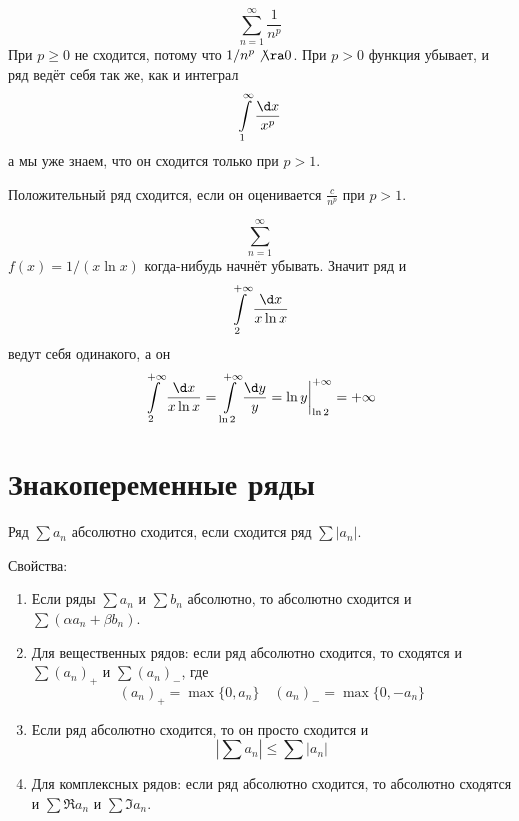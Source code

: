 \begin{exmp}
	\[ \sum_{n=1}^\infty \frac1{n^p} \]
	При $p \ge 0$ не сходится, потому что $1/n^p \not\ra 0$.
	При $p > 0$ функция убывает, и ряд ведёт себя так же, как и интеграл
	\[ \int\limits_1^\infty \frac{\d x}{x^p} \]
	а мы уже знаем, что он сходится только при $p > 1$.
\end{exmp}

\begin{conseq}
	Положительный ряд сходится, если он оценивается $\frac{c}{n^p}$ при $p > 1$.
\end{conseq}

\begin{conseq}
	\[ \sum_{n=1}^\infty \]
	$f(x) = 1/(x \ln x)$ когда-нибудь начнёт убывать.
	Значит ряд и
	\[ \int\limits_2^{+\infty} \frac{\d x}{x \ln x} \]
	ведут себя одинакого, а он
	\[ \int\limits_2^{+\infty} \frac{\d x}{x \ln x} = \int\limits_{\ln 2}^{+\infty} \frac{\d y}y = \ln y \biggr|_{\ln 2}^{+\infty} = +\infty \]
\end{conseq}

\section{Знакопеременные ряды}

\begin{Def}
	Ряд $\sum a_n$ абсолютно сходится, если сходится ряд $\sum |a_n|$.
\end{Def}

Свойства:
\begin{enumerate}
\item
	Если ряды $\sum a_n$ и $\sum b_n$ абсолютно, то абсолютно сходится и $\sum (\alpha a_n + \beta b_n)$.

\item
	Для вещественных рядов: если ряд абсолютно сходится, то сходятся и $\sum (a_n)_+$ и $\sum (a_n)_-$, где
	\[ (a_n)_+ = \max \{0, a_n\} \quad (a_n)_- = \max \{0, -a_n\} \]

\item
	Если ряд абсолютно сходится, то он просто сходится и
	\[ \left| \sum a_n \right| \le \sum |a_n| \]

\item
	Для комплексных рядов: если ряд абсолютно сходится, то абсолютно сходятся и $\sum \Re a_n$ и $\sum \Im a_n$.
\end{enumerate}

